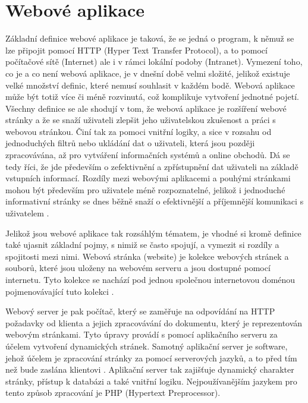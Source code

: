 \chapter{Webové aplikace}
Základní definice webové aplikace je taková, že se jedná o program, k němuž se lze připojit pomocí HTTP (Hyper Text Transfer Protocol), a to pomocí počítačové sítě (Internet) ale i v rámci lokální podoby (Intranet). Vymezení toho, co je a co není webová aplikace, je v dnešní době velmi složité, jelikož existuje velké množství definic, které nemusí souhlasit v každém bodě. Webová aplikace může být totiž více či méně rozvinutá, což komplikuje vytvoření jednotné pojetí. Všechny definice se ale shodují v tom, že webová aplikace je rozšíření webové stránky a že se snaží uživateli zlepšit jeho uživatelskou zkušenost a práci s webovou stránkou. Činí tak za pomoci vnitřní logiky, a sice v rozsahu od jednoduchých filtrů nebo ukládání dat o uživateli, která jsou později zpracovávána, až pro vytváření informačních systémů a online obchodů. Dá se tedy říci, že jde především o zefektivnění a zpřístupnění dat uživateli na základě vstupních informací. Rozdíly mezi webovými aplikacemi a pouhými stránkami mohou být především pro uživatele méně rozpoznatelné, jelikož i jednoduché informativní stránky se dnes běžně snaží o efektivnější a příjemnější komunikaci s uživatelem \cite{differencewebapps}.

Jelikož jsou webové aplikace tak rozsáhlým tématem, je vhodné si kromě definice také ujasnit základní pojmy, s nimiž se často spojují, a vymezit si rozdíly a spojitosti mezi nimi. Webová stránka (website) je kolekce webových stránek a souborů, které jsou uloženy na webovém serveru a jsou dostupné pomocí internetu. Tyto kolekce se nachází pod jednou společnou internetovou doménou pojmenovávající tuto kolekci \cite{website}.

Webový server je pak počítač, který se zaměřuje na odpovídání na HTTP požadavky od klienta a jejich zpracovávání do dokumentu, který je reprezentován webovým stránkami. Tyto úpravy provádí s pomocí aplikačního serveru za účelem vytvoření dynamických stránek. Samotný aplikační server je software, jehož účelem je zpracování stránky za pomocí serverových jazyků, a to před tím než bude zaslána klientovi \cite{webserver}. Aplikační server tak zajišťuje dynamický charakter stránky, přístup k databázi a také vnitřní logiku. Nejpoužívanějším jazykem pro tento způsob zpracování je PHP (Hypertext Preprocessor).

